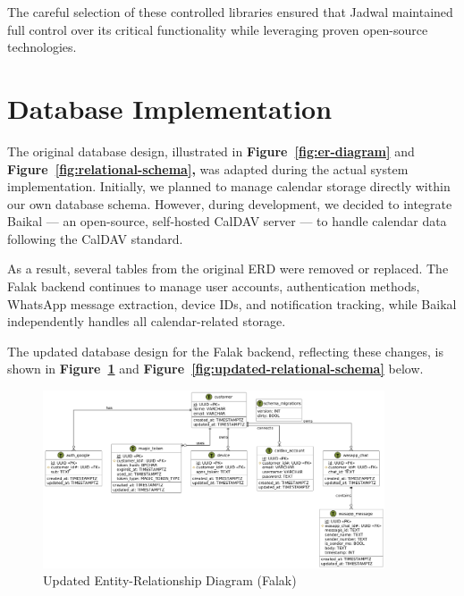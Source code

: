 The careful selection of these controlled libraries ensured that Jadwal maintained full control over its critical functionality while leveraging proven open-source technologies.


\section{Database Implementation}

The original database design, illustrated in \textbf{Figure~\ref{fig:er-diagram}} and \textbf{Figure~\ref{fig:relational-schema},} was adapted during the actual system implementation. Initially, we planned to manage calendar storage directly within our own database schema. However, during development, we decided to integrate Baikal — an open-source, self-hosted CalDAV server — to handle calendar data following the CalDAV standard.

As a result, several tables from the original ERD were removed or replaced. The Falak backend continues to manage user accounts, authentication methods, WhatsApp message extraction, device IDs, and notification tracking, while Baikal independently handles all calendar-related storage.

The updated database design for the Falak backend, reflecting these changes, is shown in \textbf{Figure~\ref{fig:updated-er-diagram}} and \textbf{Figure~\ref{fig:updated-relational-schema}} below.

\begin{figure}[!h]
    \centering
    \includegraphics[width=0.9\textwidth]{images/docs/diagrams/er/new-database/Updated Falak ERD.png}
    \caption{Updated Entity-Relationship Diagram (Falak)}
    \label{fig:updated-er-diagram}
\end{figure}


